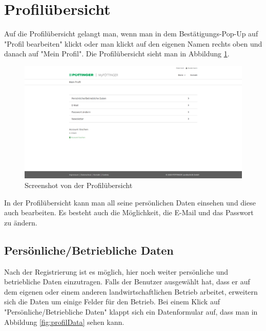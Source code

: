 \section{Profilübersicht}

Auf die Profilübersicht gelangt man, wenn man in dem Bestätigungs-Pop-Up auf "Profil bearbeiten" klickt oder man klickt auf den eigenen Namen rechts oben und danach auf "Mein Profil". Die Profilübersicht sieht man in Abbildung \ref{fig:profil}.

\begin{figure}[H]
	\centerline{
		\includegraphics[width=1\textwidth, frame]{./grafiken/erm_profil.png}
	}
	\vskip0pt
	\caption{Screenshot von der Profilübersicht} \label{fig:profil}
\end{figure}

In der Profilübersicht kann man all seine persönlichen Daten einsehen und diese auch bearbeiten. Es besteht auch die Möglichkeit, die E-Mail und das Passwort zu ändern.

\subsection{Persönliche/Betriebliche Daten}

Nach der Registrierung ist es möglich, hier noch weiter persönliche und betriebliche Daten einzutragen. Falls der Benutzer ausgewählt hat, dass er auf dem eigenen oder einem anderen landwirtschaftlichen Betrieb arbeitet, erweitern sich die Daten um einige Felder für den Betrieb. Bei einem Klick auf "Persönliche/Betriebliche Daten" klappt sich ein Datenformular auf, dass man in Abbildung \ref{fig:profilData} sehen kann.

